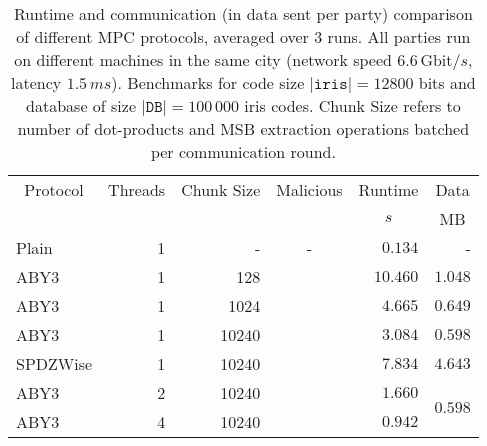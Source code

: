 \documentclass[a4paper,11pt,
]{article}
\newcommand{\cmark}{\ding{51}}%
\newcommand{\xmark}{\ding{55}}%
\begin{document}
\begin{table}[ht]
    \centering
    \caption{Runtime and communication (in data sent per party) comparison of different MPC protocols, averaged over 3 runs. All parties run on different machines in the same city (network speed $6.6\,\text{Gbit}/s$, latency $1.5\,ms$). Benchmarks for code size $|\texttt{iris}| = 12800$ bits and database of size $|\texttt{DB}| = 100\,000$ iris codes. Chunk Size refers to number of dot-products and MSB extraction operations batched per communication round.}
    \label{tab::bench_network_100k}
    \begin{tabular}{lrrcrr}
        \toprule
        \multicolumn{1}{c}{Protocol} & \multicolumn{1}{c}{Threads} & \multicolumn{1}{c}{Chunk Size} & \multicolumn{1}{c}{Malicious} & \multicolumn{1}{c}{Runtime} & \multicolumn{1}{c}{Data} \\
                                     &                             &                                &                               & \multicolumn{1}{c}{$s$}     & \multicolumn{1}{c}{MB}   \\
        \midrule
        Plain                        & 1                           & -                              & -                             & $0.134$                     & -                        \\
        ABY3                         & 1                           & 128                            & \xmark                        & $10.460$                    & $1.048$                  \\
        ABY3                         & 1                           & 1024                           & \xmark                        & $4.665$                     & $0.649$                  \\
        ABY3                         & 1                           & 10240                          & \xmark                        & $3.084$                     & $0.598$                  \\
        SPDZWise                     & 1                           & 10240                          & \cmark                        & $7.834$                     & $4.643$                  \\
        \midrule
        ABY3                         & 2                           & 10240                          & \xmark                        & $1.660$                     & \multirow{6}{*}{$0.598$} \\
        ABY3                         & 4                           & 10240                          & \xmark                        & $0.942$                     &                          \\

\end{tabular}
\end{table}
\end{document}
